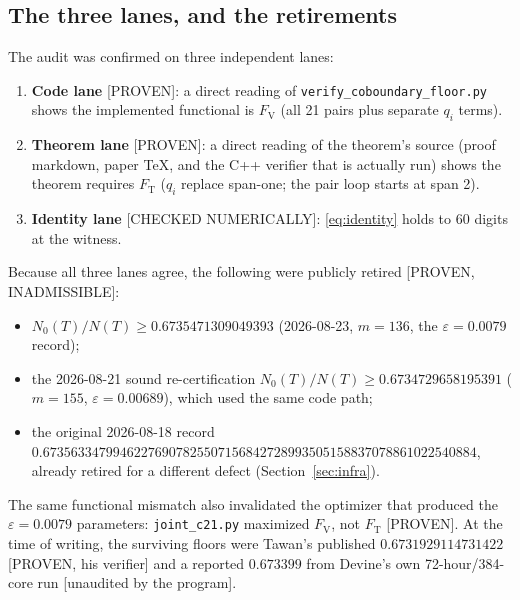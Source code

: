 \documentclass[11pt]{article}
\newcommand{\eps}{\varepsilon}
\newcommand{\Fv}{F_{\mathrm{V}}}
\newcommand{\Ft}{F_{\mathrm{T}}}
\begin{document}
\subsection{The three lanes, and the retirements}
The audit was confirmed on three independent lanes:
\begin{enumerate}
\item \textbf{Code lane} [PROVEN]: a direct reading of
  \texttt{verify\_coboundary\_floor.py} shows the implemented functional is
  $\Fv$ (all 21 pairs plus separate $q_i$ terms).
\item \textbf{Theorem lane} [PROVEN]: a direct reading of the theorem's source
  (proof markdown, paper TeX, and the C++ verifier that is actually run) shows
  the theorem requires $\Ft$ ($q_i$ replace span-one; the pair loop starts at
  span 2).
\item \textbf{Identity lane} [CHECKED NUMERICALLY]: \eqref{eq:identity} holds
  to 60 digits at the witness.
\end{enumerate}
Because all three lanes agree, the following were publicly retired
[PROVEN, INADMISSIBLE]:
\begin{itemize}
\item $N_0(T)/N(T) \ge 0.6735471309049393$ (2026-08-23, $m=136$, the %
  $\eps=0.0079$ record);
\item the 2026-08-21 sound re-certification
  $N_0(T)/N(T) \ge 0.6734729658195391$ ($m=155$, $\eps=0.00689$), which used
  the same code path;
\item the original 2026-08-18 record
  $0.67356334799462276907825507156842728993505158837078861022540884$, already
  retired for a different defect (Section~\ref{sec:infra}).
\end{itemize}
The same functional mismatch also invalidated the optimizer that produced the
$\eps=0.0079$ parameters: \texttt{joint\_c21.py} maximized $\Fv$, not $\Ft$
[PROVEN]. At the time of writing, the surviving floors were Tawan's published
$0.6731929114731422$ [PROVEN, his verifier] and a reported $0.673399$ from
Devine's own 72-hour/384-core run [unaudited by the program].
\end{document}
